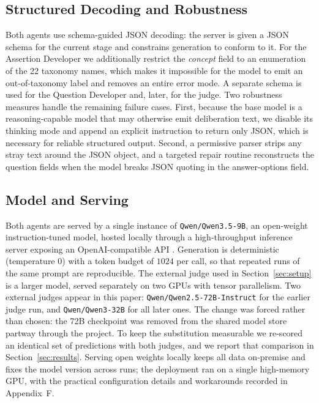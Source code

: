 \documentclass[onecolumn, 11pt]{IEEEtran}
\begin{document}
\subsection{Structured Decoding and Robustness}
Both agents use schema-guided JSON decoding: the server is given a JSON schema for the current stage and constrains generation to conform to it. For the Assertion Developer we additionally restrict the \emph{concept} field to an enumeration of the 22 taxonomy names, which makes it impossible for the model to emit an out-of-taxonomy label and removes an entire error mode. A separate schema is used for the Question Developer and, later, for the judge. Two robustness measures handle the remaining failure cases. First, because the base model is a reasoning-capable model that may otherwise emit deliberation text, we disable its thinking mode and append an explicit instruction to return only JSON, which is necessary for reliable structured output. Second, a permissive parser strips any stray text around the JSON object, and a targeted repair routine reconstructs the question fields when the model breaks JSON quoting in the answer-options field.

\subsection{Model and Serving}
Both agents are served by a single instance of \texttt{Qwen/Qwen3.5-9B}, an open-weight instruction-tuned model, hosted locally through a high-throughput inference server exposing an OpenAI-compatible API \cite{kwon2023efficient, qwen2024technical}. Generation is deterministic (temperature $0$) with a token budget of $1024$ per call, so that repeated runs of the same prompt are reproducible. The external judge used in Section~\ref{sec:setup} is a larger model, served separately on two GPUs with tensor parallelism. Two external judges appear in this paper: \texttt{Qwen/Qwen2.5-72B-Instruct} for the earlier judge run, and \texttt{Qwen/Qwen3-32B} for all later ones. The change was forced rather than chosen: the 72B checkpoint was removed from the shared model store partway through the project. To keep the substitution measurable we re-scored an identical set of predictions with both judges, and we report that comparison in Section~\ref{sec:results}. Serving open weights locally keeps all data on-premise and fixes the model version across runs; the deployment ran on a single high-memory GPU, with the practical configuration details and workarounds recorded in Appendix~F.
\end{document}

